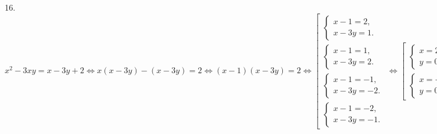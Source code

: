16. $x^2-3xy=x-3y+2\Leftrightarrow x(x-3y)-(x-3y)=2\Leftrightarrow (x-1)(x-3y)=2\Leftrightarrow
\left[\begin{array}{l} \begin{cases}x-1=2,\\  x-3y=1.\end{cases}\\ \begin{cases}x-1=1,\\  x-3y=2.\end{cases}\\ \begin{cases}x-1=-1,\\  x-3y=-2.\end{cases}\\ \begin{cases}x-1=-2,\\  x-3y=-1.\end{cases} \end{array}\right.
\Leftrightarrow \left[\begin{array}{l} \begin{cases}x=2,\\  y=0.\end{cases}\\ \begin{cases}x=-1,\\  y=0.\end{cases} \end{array}\right.$\\
